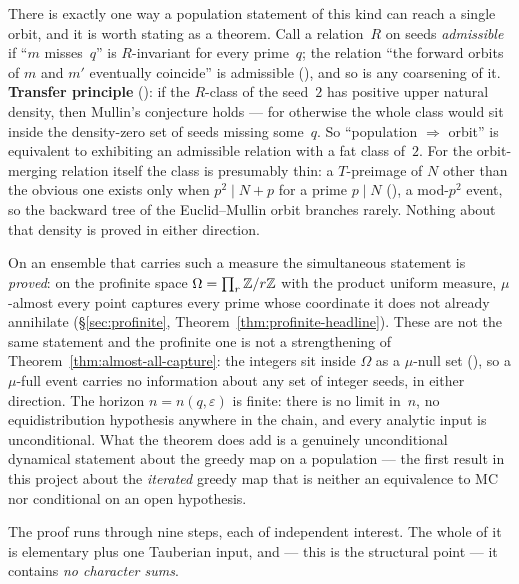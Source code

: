 \begin{remark}
There is exactly one way a population statement of this kind can reach a
single orbit, and it is worth stating as a theorem.  Call a relation~$R$
on seeds \emph{admissible} if ``$m$ misses~$q$'' is $R$-invariant for every
prime~$q$; the relation ``the forward orbits of $m$ and $m'$ eventually
coincide'' is admissible
(), and so is any
coarsening of it.  \textbf{Transfer principle}
(): if the
$R$-class of the seed~$2$ has positive upper natural density, then Mullin's
conjecture holds --- for otherwise the whole class would sit inside the
density-zero set of seeds missing some~$q$.  So ``population $\Rightarrow$
orbit'' is equivalent to exhibiting an admissible relation with a fat class
of~$2$.  For the orbit-merging relation itself the class is presumably
thin: a $T$-preimage of $N$ other than the obvious one exists only when
$p^2 \mid N + p$ for a prime $p \mid N$
(), a
mod-$p^2$ event, so the backward tree of the Euclid--Mullin orbit branches
rarely.  Nothing about that density is proved in either direction.

On an ensemble that carries
such a measure the simultaneous statement is \emph{proved}: on the
profinite space $\Omega = \prod_r \mathbb{Z}/r\mathbb{Z}$ with the product uniform
measure, $\mu$-almost every point captures every prime whose coordinate it
does not already annihilate (\S\ref{sec:profinite},
Theorem~\ref{thm:profinite-headline}).  These are not the same statement
and the profinite one is not a strengthening of
Theorem~\ref{thm:almost-all-capture}: the integers sit inside $\Omega$ as
a $\mu$-null set
(),
so a $\mu$-full event carries no information about any set of integer
seeds, in either direction.  The horizon $n = n(q,\varepsilon)$ is finite:
there is no limit in~$n$, no equidistribution hypothesis anywhere in the
chain, and every analytic input is unconditional.  What the theorem does
add is a genuinely unconditional dynamical statement about the greedy map
on a population --- the first result in this project about the
\emph{iterated} greedy map that is neither an equivalence to MC nor
conditional on an open hypothesis.
\end{remark}

The proof runs through nine steps, each of independent interest.  The
whole of it is elementary plus one Tauberian input, and --- this is the
structural point --- it contains \emph{no character sums}.

